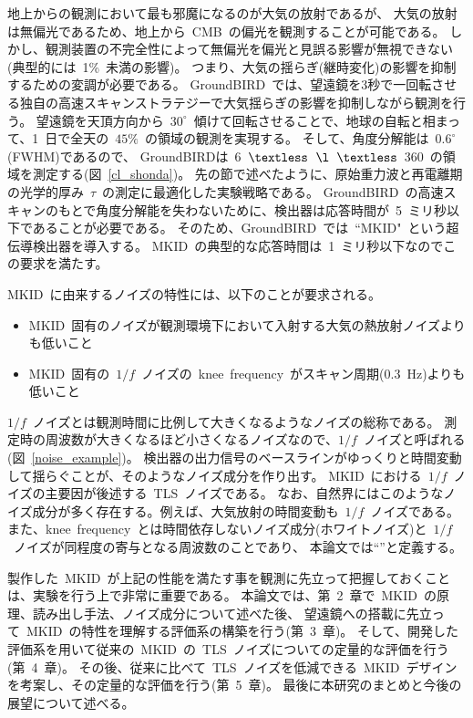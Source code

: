 地上からの観測において最も邪魔になるのが大気の放射であるが、
大気の放射は無偏光であるため、地上から~CMB~の偏光を観測することが可能である。
しかし、観測装置の不完全性によって無偏光を偏光と見誤る影響が無視できない(典型的には~1\%~未満の影響)。
つまり、大気の揺らぎ(継時変化)の影響を抑制するための変調が必要である。
GroundBIRD~では、望遠鏡を3秒で一回転させる独自の高速スキャンストラテジーで大気揺らぎの影響を抑制しながら観測を行う。
望遠鏡を天頂方向から~$30^\circ$~傾けて回転させることで、地球の自転と相まって、1~日で全天の~$45\%$~の領域の観測を実現する。
そして、角度分解能は~$0.6^{\circ}$(FWHM)であるので、
GroundBIRDは~6~$\textless$~$\l$~$\textless$~360~の領域を測定する(図~\ref{cl_shonda})。
先の節で述べたように、原始重力波と再電離期の光学的厚み~$\tau$~の測定に最適化した実験戦略である。
GroundBIRD~の高速スキャンのもとで角度分解能を失わないために、検出器は応答時間が~5~ミリ秒以下であることが必要である。
そのため、GroundBIRD~では~``MKID"~という超伝導検出器を導入する。
MKID~の典型的な応答時間は~1~ミリ秒以下なのでこの要求を満たす。

MKID~に由来するノイズの特性には、以下のことが要求される。
\begin{itemize}
  \item MKID~固有のノイズが観測環境下において入射する大気の熱放射ノイズよりも低いこと
  \item MKID~固有の~$1/f$~ノイズの~knee~frequency~がスキャン周期(0.3~Hz)よりも低いこと
\end{itemize}

$1/f$~ノイズとは観測時間に比例して大きくなるようなノイズの総称である。
測定時の周波数が大きくなるほど小さくなるノイズなので、$1/f$~ノイズと呼ばれる(図~\ref{noise_example})。
検出器の出力信号のベースラインがゆっくりと時間変動して揺らぐことが、そのようなノイズ成分を作り出す。
MKID~における~$1/f$~ノイズの主要因が後述する~TLS~ノイズである。
なお、自然界にはこのようなノイズ成分が多く存在する。例えば、大気放射の時間変動も~$1/f$~ノイズである。
また、knee~frequency~とは時間依存しないノイズ成分(ホワイトノイズ)と~$1/f$~ノイズが同程度の寄与となる周波数のことであり、
本論文では``\fknee''と定義する。

製作した~MKID~が上記の性能を満たす事を観測に先立って把握しておくことは、実験を行う上で非常に重要である。
本論文では、第~2~章で~MKID~の原理、読み出し手法、ノイズ成分について述べた後、
望遠鏡への搭載に先立って~MKID~の特性を理解する評価系の構築を行う(第~3~章)。
そして、開発した評価系を用いて従来の~MKID~の~TLS~ノイズについての定量的な評価を行う(第~4~章)。
その後、従来に比べて~TLS~ノイズを低減できる~MKID~デザインを考案し、その定量的な評価を行う(第~5~章)。
最後に本研究のまとめと今後の展望について述べる。


